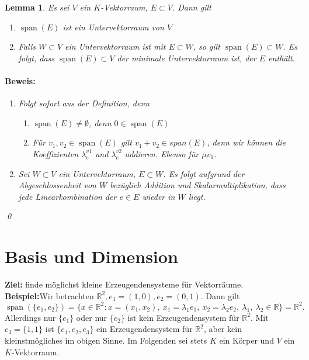 \documentclass{report}
\newcommand{\lb}{\lambda}
\newcommand{\R}{\mathbb{R}}
\DeclareMathOperator{\Span}{span}
\theoremstyle{customrem}
\theoremstyle{customdef}
\newtheorem{lemma}[definition]{Lemma}
\renewenvironment{proof}{\paragraph{Beweis: }}{\qed}
\theoremstyle{customenv}
\begin{document}
	\begin{lemma}
		Es sei \(V\) ein \(K\)-Vektorraum, \(E \subset V\). Dann gilt
		\begin{enumerate}
			\item \(\Span(E)\) ist ein Untervektorraum von \(V\)
			\item Falls \(W \subset V\) ein Untervektorraum ist mit \(E \subset W\), so gilt \(\Span(E) \subset W\). Es folgt, dass \(\Span(E) \subset V\) der minimale Untervektorraum ist, der \(E\) enthält.
		\end{enumerate}
		
		\begin{proof}
			\begin{enumerate}
				\item Folgt sofort aus der Definition, denn 
				\begin{enumerate}
					\item \(\Span(E) \neq \emptyset\), denn \(0 \in \Span(E)\)
					\item Für \(v_1, v_2 \in \Span(E)\) gilt \(v_1 + v_2 \in span(E)\), denn wir können die Koeffizienten \(\lb_e^{v1}\) und \(\lb_e^{v2}\) addieren. Ebenso für \(\mu v_1\).
				\end{enumerate}
				\item Sei \(W \subset V\) ein Untervektorraum, \(E \subset W\). Es folgt aufgrund der Abgeschlossenheit von \(W\) bezüglich Addition und Skalarmultiplikation, dass jede Linearkombination der \(e \in E\) wieder in \(W\) liegt.
			\end{enumerate}
		\end{proof}
	\end{lemma}
	
\section{Basis und Dimension}
	\textbf{Ziel:} finde möglichst kleine Erzeugendensysteme für Vektorräume.\\
	\textbf{Beispiel:}Wir betrachten \(\R^2, e_1=(1, 0), e_2 = (0,1)\). Dann gilt
	 \[
	 \Span(\{e_1, e_2\}) = \{x \in \R^2 : x = (x_1, x_2),\ x_1 = \lb_1 e_1,\ x_2 = \lb_2 e_2,\ \lb_1,\ \lb_2 \in \R\} = \R^2.
	 \] 
	Allerdings nur \(\{e_1\}\) oder nur \(\{e_2\}\) ist kein Erzeugendensystem für \(\R^2\). Mit \(e_3 = \{1, 1\}\) ist \(\{e_1, e_2, e_3\}\) ein Erzeugendensystem für \(\R^2\), aber kein kleinstmögliches im obigen Sinne.
	Im Folgenden sei stets \(K\) ein Körper und \(V\) ein \(K\)-Vektorraum.
	
\end{document}
